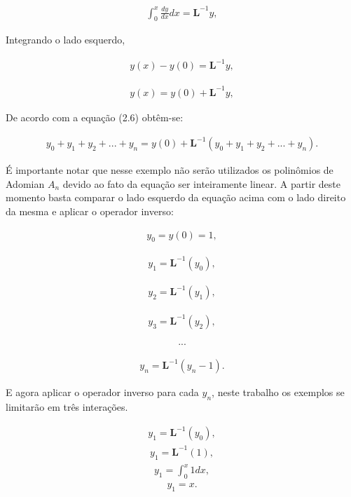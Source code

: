   \begin{gather*}
  \int_0^{x}\frac{d y}{d x}dx = \textbf{L}^{-1} y,
\end{gather*} 

Integrando o lado esquerdo,

 \begin{gather*}
  y(x) - y(0) = \textbf{L}^{-1} y,
\end{gather*} 

 \begin{gather*}
  y(x) = y(0) + \textbf{L}^{-1} y,
\end{gather*} 
 
 De acordo com a equação (2.6) obtêm-se:
 
  \begin{gather*}
  y_{0} +y_{1} + y_{2} + ... + y_{n}  = y(0) + \textbf{L}^{-1}( y_{0} +y_{1} + y_{2} + ... + y_{n}).
\end{gather*}

É importante notar que nesse exemplo não serão utilizados os polinômios de Adomian $A_{n}$  devido ao fato da equação ser inteiramente linear.
A partir deste momento basta comparar o lado esquerdo da equação acima com o lado direito da mesma e aplicar o operador inverso:

\begin{gather*}
  y_{0} = y(0) = 1,
\end{gather*}

\begin{gather*}
  y_{1} = \textbf{L}^{-1} (y_{0}),
\end{gather*}

\begin{gather*}
  y_{2} = \textbf{L}^{-1} (y_{1}),
\end{gather*}

\begin{gather*}
  y_{3} = \textbf{L}^{-1} (y_{2}),
\end{gather*}

\begin{gather*}
  ...
\end{gather*}

 \begin{gather*}
  y_{n} = \textbf{L}^{-1} (y_{n} - 1).
\end{gather*}

E agora aplicar o operador inverso para cada $y_{n}$, neste trabalho os exemplos se limitarão em três interações. 

\begin{gather*}
  y_{1} = \textbf{L}^{-1} (y_{0}),
\end{gather*}
\begin{gather*}
  y_{1} = \textbf{L}^{-1}(1),
\end{gather*}
\begin{gather*}
  y_{1} =\int_0^{x} 1dx,
\end{gather*}
\begin{gather*}
  y_{1} = x.
\end{gather*}



